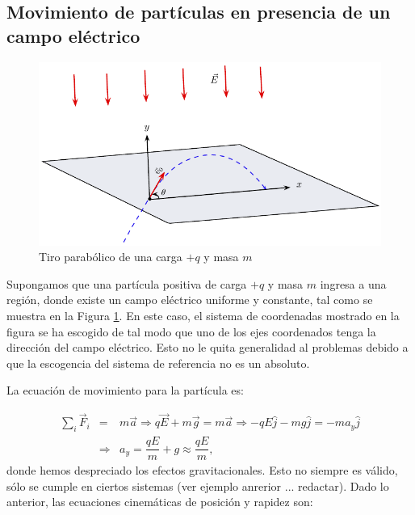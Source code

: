 \begin{enumerate}
\end{enumerate}


\subsection{Movimiento de partículas en presencia de un campo eléctrico}

\begin{figure}
\begin{center}
\includegraphics[scale=1.0]{electrostatica/tiroparabolico1}
\end{center}
\caption{Tiro parabólico de una carga $+q$ y masa $m$}
\label{tiroparabolico}
\end{figure}

Supongamos que una partícula positiva de carga $+q$ y masa $m$ ingresa a una región, donde existe un campo eléctrico uniforme y constante, tal como se muestra en la Figura \ref{tiroparabolico}. En este caso, el sistema de coordenadas mostrado en la figura se ha escogido de tal modo que uno de los ejes coordenados tenga la dirección del campo eléctrico. Esto no le quita generalidad al problemas debido a que la escogencia del sistema de referencia no es un absoluto. 

La ecuación de movimiento para la partícula es:

\begin{eqnarray}
\nonumber
\sum_{i} \vec{F}_i &=& m\vec{a} \Rightarrow q \vec{E} + m\vec{g}=m\vec{a} \Rightarrow -qE\hat{j}-mg\hat{j}=-ma_y\hat{j} \\
&\Rightarrow & a_y = \dfrac{qE}{m}+g \approx \dfrac{qE}{m} ,
\end{eqnarray}
donde hemos despreciado los efectos gravitacionales. Esto no siempre es válido, sólo se cumple en ciertos sistemas (ver ejemplo anrerior ... redactar). 
Dado lo anterior, las ecuaciones cinemáticas de posición y rapidez son:

